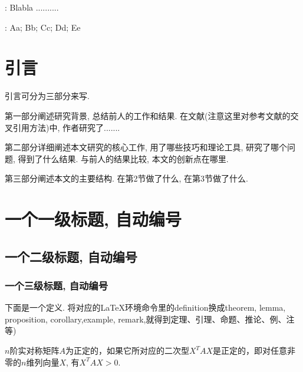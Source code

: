 \documentclass[UTF8,oneside,12pt]{article}  %
\newcommand{\wuhao}{\fontsize{10.5pt}{\baselineskip}\selectfont}
\theoremstyle{DingLi1}
\numberwithin{equation}{section}
\newtheorem{definition}{\hskip 2em 定义}[section]
\theoremstyle{DingLi2}
\begin{document}
{\wuhao
{}
:
Blabla ..........

:
Aa;  Bb;  Cc;  Dd;  Ee

}
\vskip 1cm

\section{引言}

引言可分为三部分来写.

 第一部分阐述研究背景, 总结前人的工作和结果. 在文献\cite{Liang-Xu-Auto18}(注意这里对参考文献的交叉引用方法)中, 作者研究了.......

第二部分详细阐述本文研究的核心工作, 用了哪些技巧和理论工具, 研究了哪个问题, 得到了什么结果. 与前人的结果比较,  本文的创新点在哪里.

第三部分阐述本文的主要结构. 在第2节做了什么, 在第3节做了什么.





\section{一个一级标题, 自动编号}

\subsection{一个二级标题, 自动编号}

\subsubsection{一个三级标题, 自动编号}

下面是一个定义. 将对应的\LaTeX{}环境命令里的definition换成theorem, lemma, proposition, corollary,example, remark,就得到定理、引理、命题、推论、例、注等)
\begin{definition}\label{Def: positive def matrix}
$n$阶实对称矩阵$A$为正定的，如果它所对应的二次型$X^T A X$是正定的，即对任意非零的$n$维列向量$X$, 有$X^T A X>0$.
\end{definition}
\end{document}

